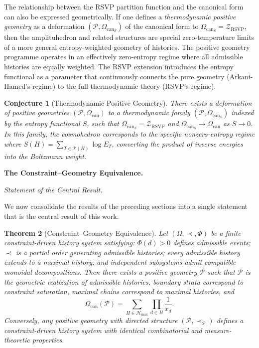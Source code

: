 \documentclass[12pt, oneside]{amsart}
\theoremstyle{plain}
\newtheorem{theorem}{Theorem}[section]
\newtheorem{conjecture}[theorem]{Conjecture}
\theoremstyle{definition}
\theoremstyle{remark}
\newcommand{\Phif}{\Phi}
\newcommand{\Sf}{S}
\newcommand{\OmKS}{\Omega}
\newcommand{\CF}{\Omega_{\mathrm{can}}}
\newcommand{\ZRSVP}{\mathcal{Z}_{\mathrm{RSVP}}}
\newcommand{\Hmax}{\mathcal{H}_{\max}}
\begin{document}
The relationship between the RSVP partition function and the canonical form can also be expressed geometrically. If one defines a \emph{thermodynamic positive geometry} as a deformation $(\mathcal{P}, \CF_{\Sf})$ of the canonical form to $\CF_{\Sf} = \ZRSVP$, then the amplituhedron and related structures are special zero-temperature limits of a more general entropy-weighted geometry of histories. The positive geometry programme operates in an effectively zero-entropy regime where all admissible histories are equally weighted. The RSVP extension introduces the entropy functional as a parameter that continuously connects the pure geometry (Arkani-Hamed's regime) to the full thermodynamic theory (RSVP's regime).

\begin{conjecture}[Thermodynamic Positive Geometry]
There exists a deformation of positive geometries $(\mathcal{P}, \CF)$ to a thermodynamic family $(\mathcal{P}, \CF_{\Sf})$ indexed by the entropy functional $\Sf$, such that $\CF_{\Sf} = \ZRSVP$ and $\CF_{\Sf} \to \CF$ as $\Sf \to 0$. In this family, the cosmohedron corresponds to the specific nonzero-entropy regime where $\Sf(H) = \sum_{T \in \mathcal{T}(H)} \log E_T$, converting the product of inverse energies into the Boltzmann weight.
\end{conjecture}

\bigskip\noindent\textbf{The Constraint--Geometry Equivalence.}
\label{sec:master}

\medskip\noindent\textit{Statement of the Central Result.}

We now consolidate the results of the preceding sections into a single statement that is the central result of this work.

\begin{theorem}[Constraint--Geometry Equivalence]
\label{thm:master}
Let $(\OmKS, \prec, \Phif)$ be a finite constraint-driven history system satisfying: $\Phif(d) > 0$ defines admissible events; $\prec$ is a partial order generating admissible histories; every admissible history extends to a maximal history; and independent subsystems admit compatible monoidal decompositions. Then there exists a positive geometry $\mathcal{P}$ such that $\mathcal{P}$ is the geometric realization of admissible histories, boundary strata correspond to constraint saturation, maximal chains correspond to maximal histories, and
\[
  \CF(\mathcal{P}) = \sum_{H \in \Hmax} \prod_{d \in H} \frac{1}{x_d}.
\]
Conversely, any positive geometry with directed structure $(\mathcal{P}, \prec_{\mathcal{P}})$ defines a constraint-driven history system with identical combinatorial and measure-theoretic properties.
\end{theorem}
\end{document}
